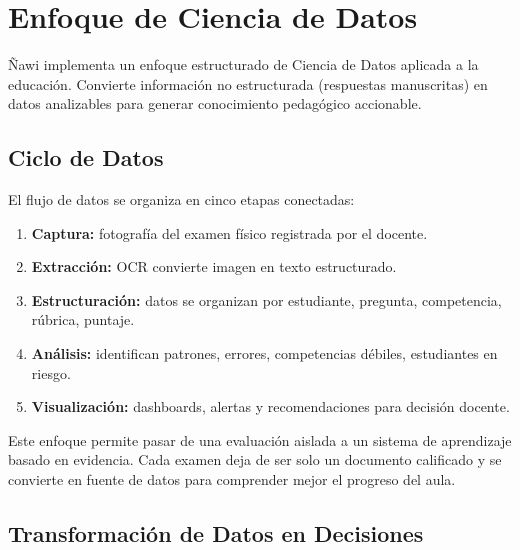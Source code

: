 \documentclass[12pt]{article}
\begin{document}
\section{Enfoque de Ciencia de Datos}

Ñawi implementa un enfoque estructurado de Ciencia de Datos aplicada a la educación. Convierte información no estructurada (respuestas manuscritas) en datos analizables para generar conocimiento pedagógico accionable.

\subsection{Ciclo de Datos}

El flujo de datos se organiza en cinco etapas conectadas:

\begin{enumerate}
    \item \textbf{Captura:} fotografía del examen físico registrada por el docente.
    \item \textbf{Extracción:} OCR convierte imagen en texto estructurado.
    \item \textbf{Estructuración:} datos se organizan por estudiante, pregunta, competencia, rúbrica, puntaje.
    \item \textbf{Análisis:} identifican patrones, errores, competencias débiles, estudiantes en riesgo.
    \item \textbf{Visualización:} dashboards, alertas y recomendaciones para decisión docente.
\end{enumerate}

Este enfoque permite pasar de una evaluación aislada a un sistema de aprendizaje basado en evidencia. Cada examen deja de ser solo un documento calificado y se convierte en fuente de datos para comprender mejor el progreso del aula.

\subsection{Transformación de Datos en Decisiones}
\end{document}

